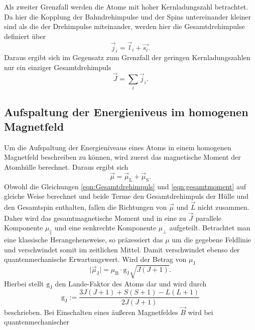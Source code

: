 Als zweiter Grenzfall werden die Atome mit hoher Kernladungszahl betrachtet.
Da hier die Kopplung der Bahndrehimpulse und der Spins untereinander kleiner sind
als die der Drehimpulse miteinander, werden hier die Gesamtdrehimpulse definiert
über
\begin{equation}
  \vec{j}_i = \vec{l}_i + \vec{s_i}.
  \label{eqn:gesamt}
\end{equation}
Daraus ergibt sich im Gegensatz zum Grenzfall der geringen Kernladungszahlen nur
ein einziger Gesamtdrehimpuls
\begin{equation}
  \vec{J} = \sum_i \vec{j}_i.
  \label{eqn:Gesamtdrehimpuls}
\end{equation}

\subsection{Aufspaltung der Energieniveus im homogenen Magnetfeld}
\label{sec:aufspaltung}
Um die Aufspaltung der Energieniveaus eines Atoms in einem homogenen Magnetfeld
beschreiben zu können, wird zuerst das magnetische Moment der Atomhülle berechnet.
Daraus ergibt sich
\begin{equation}
  \vec{\mu} = \vec{\mu}_\text{L} + \vec{\mu}_\text{S}.
  \label{eqn:gesamtmoment}
\end{equation}
Obwohl die Gleichungen \ref{eqn:Gesamtdrehimpuls} und \ref{eqn:gesamtmoment}
auf gleiche Weise berechnet und beide Terme den Gesamtdrehimpuls der Hülle und
den Gesamtspin enthalten, fallen die Richtungen von $\vec{\mu}$ und $\vec{L}$
nicht zusammen. Daher wird das gesamtmagnetische Moment und in eine zu $\vec{J}$
parallele Komponente $\mu_{\parallel}$ und eine senkrechte Komponente $\mu_{\bot}$
aufgeteilt. Betrachtet man eine klassische Herangehensweise, so präzessiert das
$\mu$ um die gegebene Feldlinie und verschwindet somit im zeitlichen Mittel. Damit
verschwindet ebenso der quantenmechanische Erwartungswert. Wird der Betrag von
$\mu_\text{J}$
\begin{equation}
  \mid \vec{\mu}_\text{J} \mid = \mu_\text{B}\cdot \text{g}_\text{J} \sqrt{J\left(J+1 \right)}.
\end{equation}
Hierbei stellt $\text{g}_\text{J}$ den Lande-Faktor des Atoms dar und wird durch
\begin{equation}
  \text{g}_\text{J} := \frac{3J\left(J+1 \right) + S\left(S+1 \right) - L\left(L+1 \right)}{2J\left(J+1 \right)}
  \label{eqn:lande}
\end{equation}
beschrieben.
Bei Einschalten eines äußeren Magnetfeldes $\vec{B}$ wird bei quantenmechanischer
